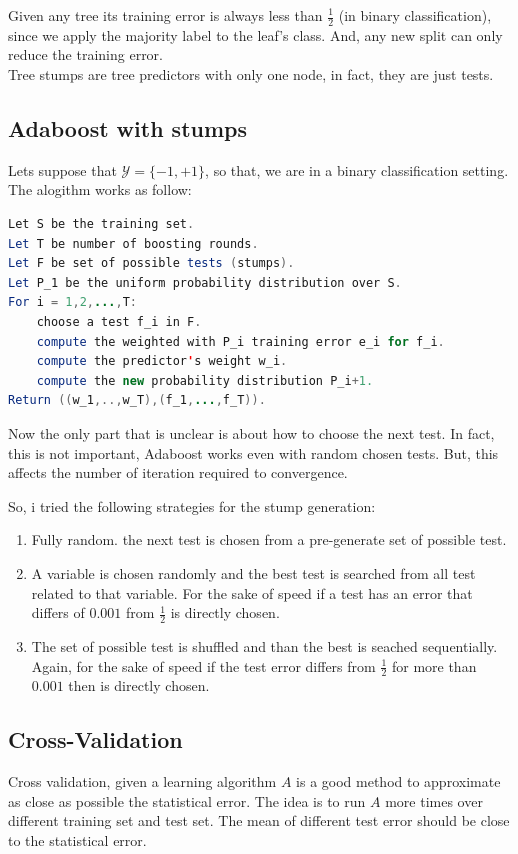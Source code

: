 \documentclass{article}
\begin{document}
Given any tree its training error is always less than $\frac{1}{2}$ (in binary classification), 
since we apply the majority label to the leaf's class.
And, any new split can only reduce the training error.\\

Tree stumps are tree predictors with only one node, in fact, they are just tests.

\subsection{Adaboost with stumps}
Lets suppose that $\mathcal{Y} = \{-1,+1\}$, so that, we are in a binary classification setting.
The alogithm works as follow:

\begin{lstlisting}[language=Java]
Let S be the training set.
Let T be number of boosting rounds.
Let F be set of possible tests (stumps).
Let P_1 be the uniform probability distribution over S.
For i = 1,2,...,T:
	choose a test f_i in F.
	compute the weighted with P_i training error e_i for f_i.
	compute the predictor's weight w_i.
	compute the new probability distribution P_i+1.
Return ((w_1,..,w_T),(f_1,...,f_T)).
\end{lstlisting}

Now the only part that is unclear is about how to choose the next test.
In fact, this is not important, Adaboost works even with random chosen tests. But, this affects the number of iteration
required to convergence.

So, i tried the following strategies for the stump generation:
\begin{enumerate}
	\item Fully random. the next test is chosen from a pre-generate set of possible test.
	\item A variable is chosen randomly and the best test is searched from all test related to that variable.
	For the sake of speed if a test has an error that differs of $0.001$ from $\frac{1}{2}$ is directly chosen.
	\item The set of possible test is shuffled and than the best is seached sequentially. Again, for the sake
	of speed if the test error differs from $\frac{1}{2}$ for more than $0.001$ then is directly chosen.
\end{enumerate}

\subsection{Cross-Validation}
Cross validation, given a learning algorithm $A$ is a good method to approximate 
as close as possible the statistical error. The idea is to run $A$ more times over different
training set and test set. The mean of different test error should be close to the statistical error.
\end{document}
